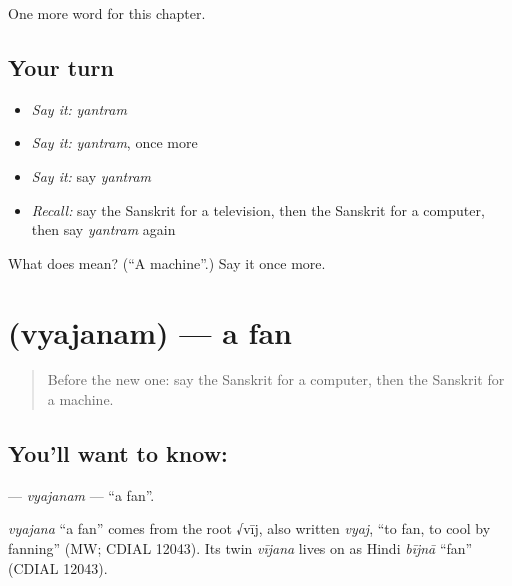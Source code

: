 \begin{grammarlens}[title={What you've built}]
One more word for this chapter.
\end{grammarlens}

\subsection*{Your turn}
\begin{itemize}
\raggedright
  \item \emph{Say it:} \emph{yantram}
  \item \emph{Say it:} \emph{yantram}, once more
  \item \emph{Say it:} say \emph{yantram}
  \item \emph{Recall:} say the Sanskrit for a television, then the Sanskrit for a computer, then say \emph{yantram} again
\end{itemize}

\begin{tcolorbox}[breakable,colback=teal!4,colframe=teal!35!black,title={Before you move on}]
What does  mean? (\textquotedblleft{}A machine\textquotedblright{}.) Say it once more.
\end{tcolorbox}
\section[\texorpdfstring{\sk{व्यजनम्} (vyajanam)}{व्यजनम् (vyajanam)}]{ (vyajanam) — a fan}

\label{lesson:SA-C105-vyajanam}



\begin{quote}
Before the new one: say the Sanskrit for a computer, then the Sanskrit for a machine.
\end{quote}

\subsection*{You'll want to know: }
\textbf{} — \emph{vyajanam} — \textquotedblleft{}a fan\textquotedblright{}.

\begin{cousinweb}
\emph{vyajana} \textquotedblleft{}a fan\textquotedblright{} comes from the root √vīj, also written \emph{vyaj}, \textquotedblleft{}to fan, to cool by fanning\textquotedblright{} (MW; CDIAL 12043). Its twin \emph{vījana} lives on as Hindi \emph{bījnā} \textquotedblleft{}fan\textquotedblright{} (CDIAL 12043).
\end{cousinweb}

